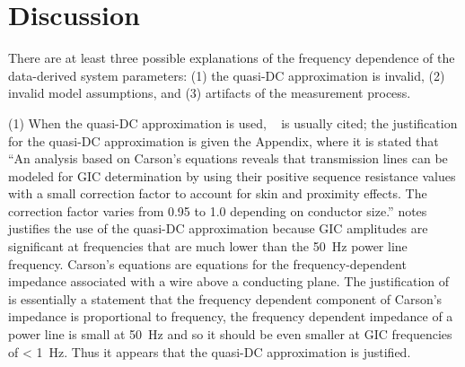 \documentclass[draft,linenumbers]{agujournal2018}
\begin{document}



\section{Discussion}

There are at least three possible explanations of the frequency dependence of the data-derived system parameters: (1) the quasi-DC approximation is invalid, (2) invalid model assumptions, and (3) artifacts of the measurement process. 

(1) When the quasi-DC approximation is used, ~\cite{Albertson1981} is usually cited; the justification for the quasi-DC approximation is given the Appendix, where it is stated that ``An analysis based on Carson's equations reveals that transmission lines can be modeled for GIC determination by using their positive sequence resistance values with a small correction factor to account for skin and proximity effects. The correction factor varies from 0.95 to 1.0 depending on conductor size.'' \cite{Lehtinen1985} notes justifies the use of the quasi-DC approximation because GIC amplitudes are significant at frequencies that are much lower than the 50~Hz power line frequency. Carson's equations are equations for the frequency-dependent impedance associated with a wire above a conducting plane. The justification of \cite{Lehtinen1985} is essentially a statement that the frequency dependent component of Carson's impedance is proportional to frequency, the frequency dependent impedance of a power line is small at 50~Hz and so it should be even smaller at GIC frequencies of < 1~Hz.  Thus it appears that the quasi-DC approximation is justified.
\end{document}
